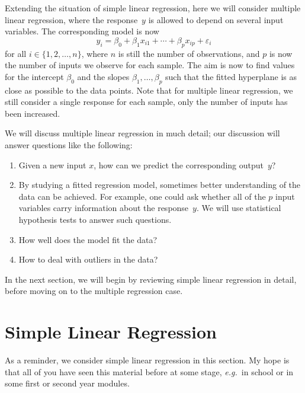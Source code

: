 \documentclass[
  a4paper,
]{article}
\providecommand{\tightlist}{%
  \setlength{\itemsep}{0pt}\setlength{\parskip}{0pt}}
\theoremstyle{definition}
\theoremstyle{definition}
\theoremstyle{definition}
\theoremstyle{definition}
\theoremstyle{remark}
\begin{document}
Extending the situation of simple linear regression, here
we will consider multiple linear regression, where the response~\(y\)
is allowed to depend on several input variables. The corresponding
model is now
\begin{equation*}
  y_i = \beta_0 + \beta_1 x_{i1} + \cdots + \beta_p x_{ip} + \varepsilon_i
\end{equation*}
for all \(i \in \{1, 2, \ldots, n\}\), where \(n\) is still the number
of observations, and \(p\) is now the number of inputs we observe for
each sample.
The aim is now to find values for the intercept \(\beta_0\) and the
slopes \(\beta_1, \ldots, \beta_p\) such that the fitted hyperplane
is as close as possible to the data points.
Note that for multiple linear regression, we still consider a
single response for each sample, only the number of inputs has been
increased.

We will discuss multiple linear regression in much detail; our discussion
will answer questions like the following:

\begin{enumerate}
\def\labelenumi{\arabic{enumi}.}
\tightlist
\item
  Given a new input \(x\), how can we predict
  the corresponding output~\(y\)?
\item
  By studying a fitted regression model, sometimes better understanding
  of the data can be achieved. For example, one could ask whether
  all of the \(p\) input variables carry information about the response~\(y\).
  We will use statistical hypothesis tests to answer such questions.
\item
  How well does the model fit the data?
\item
  How to deal with outliers in the data?
\end{enumerate}

In the next section, we will begin by reviewing simple linear regression in
detail, before moving on to the multiple regression case.

\clearpage

\section{Simple Linear Regression}\label{S01-simple}

As a reminder, we consider simple linear regression in this section.
My hope is that all of you have seen this material before at some
stage, \emph{e.g.}~in school or in some first or second year modules.
\end{document}
